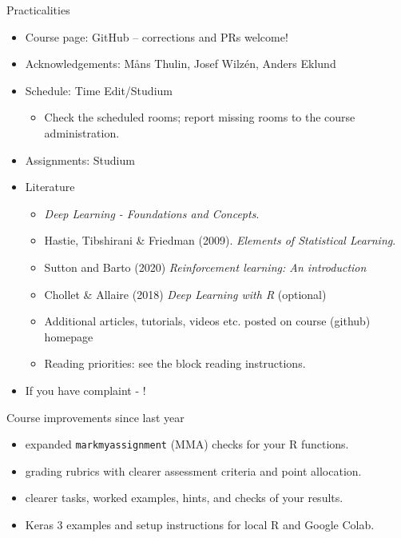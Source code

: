 \documentclass[10pt]{beamer}
\begin{document}
\begin{frame}{Practicalities}

\begin{itemize}
\item Course page: GitHub -- corrections and PRs welcome!\pause
\item Acknowledgements: M{\aa}ns Thulin, Josef Wilzén, Anders Eklund\pause
\item Schedule: Time Edit/Studium
\begin{itemize}
\item Check the scheduled rooms; report missing rooms to the course administration.
\end{itemize}
\item Assignments: Studium\pause
\item Literature
\begin{itemize}
\item {} \emph{Deep Learning - Foundations and Concepts}.
\item Hastie, Tibshirani \& Friedman (2009). \emph{Elements of Statistical Learning}.
\item Sutton and Barto (2020) \emph{Reinforcement learning: An introduction}
\item Chollet \& Allaire (2018) \emph{Deep Learning with R} (optional)
\item Additional articles, tutorials, videos etc. posted on course (github) homepage
\item Reading priorities: see the block reading instructions.
\end{itemize}
\pause
\item If you have complaint - !
\end{itemize}

\end{frame}



\begin{frame}{Course improvements since last year}

\begin{itemize}
\item {} expanded \texttt{markmyassignment} (MMA) checks for your R functions.
\item {} grading rubrics with clearer assessment criteria and point allocation.
\item {} clearer tasks, worked examples, hints, and checks of your results.
\item {} Keras 3 examples and setup instructions for local R and Google Colab.
\end{itemize}

\end{frame}
\end{document}
